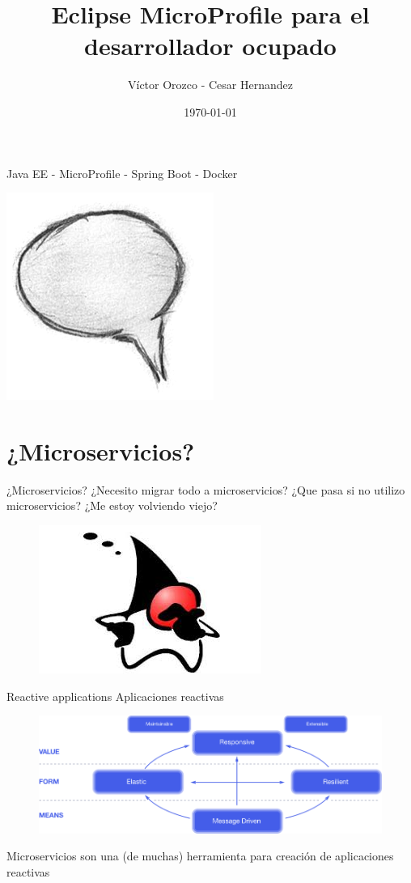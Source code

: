\documentclass{beamer}
\title{Eclipse MicroProfile para el desarrollador ocupado}
\author{Víctor Orozco - Cesar Hernandez}
\institute{@tuxtor - @CesarHgt}
\date{\today}
\begin{document}
\frame{\titlepage}

\begin{frame}{Java EE - MicroProfile - Spring Boot - Docker}
\begin{center}
	\includegraphics[width=0.4\linewidth]{Images/comment}
\end{center}
\end{frame}

\section{¿Microservicios?}
\begin{frame}{¿Microservicios?}
\Large ¿Necesito migrar todo a microservicios? ¿Que pasa si no utilizo microservicios? ¿Me estoy volviendo viejo?
\begin{figure}
	\centering
	\includegraphics[width=0.6\linewidth]{Images/dukewhy}
\end{figure}
\end{frame}

\begin{frame}{Reactive applications}
Aplicaciones reactivas
\begin{figure}
	\centering
	\includegraphics[width=\linewidth]{Images/reactive-traits}
\end{figure}
Microservicios son una (de muchas) herramienta para creación de aplicaciones reactivas
\end{frame}
\end{document}
